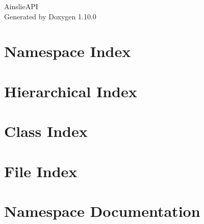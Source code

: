 \documentclass[twoside]{book}
\newcommand{\+}{\discretionary{\mbox{\scriptsize$\hookleftarrow$}}{}{}}
\newcommand{\clearemptydoublepage}{%
    \newpage{\pagestyle{empty}\cleardoublepage}%
  }
\begin{document}
  \raggedbottom
    \hypersetup{pageanchor=false,
                bookmarksnumbered=true,
                pdfencoding=unicode
               }
  \begin{titlepage}
  \vspace*{7cm}
  \begin{center}%
  {\Large Ainslie\+API}\\
  \vspace*{1cm}
  {\large Generated by Doxygen 1.10.0}\\
  \end{center}
  \end{titlepage}
  \clearemptydoublepage
  \tableofcontents
  \clearemptydoublepage
  \hypersetup{pageanchor=true}
\chapter{Namespace Index}

\chapter{Hierarchical Index}

\chapter{Class Index}

\chapter{File Index}

\chapter{Namespace Documentation}

























\end{document}
